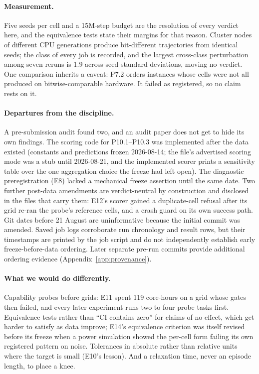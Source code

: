 \paragraph{Measurement.} Five seeds per cell and a 15M-step budget are the
resolution of every verdict here, and the equivalence tests state their
margins for that reason. Cluster nodes of different CPU generations produce
bit-different trajectories from identical seeds; the class of every job is
recorded, and the largest cross-class perturbation among seven reruns is
$1.9$ across-seed standard deviations, moving no verdict. One comparison
inherits a caveat: P7.2 orders instances whose cells were not all produced on
bitwise-comparable hardware. It failed as registered, so no claim rests on it.

\paragraph{Departures from the discipline.} A pre-submission audit found
two, and an audit paper does not get to hide its own findings. The scoring
code for P10.1--P10.3 was implemented after the data existed (constants and
predictions frozen 2026-08-14; the file's advertised scoring mode was a stub
until 2026-08-21, and the implemented scorer prints a sensitivity table over
the one aggregation choice the freeze had left open). The diagnostic
preregistration (E8) lacked a mechanical freeze assertion until the same date.
Two further post-data amendments are verdict-neutral by construction and
disclosed in the files that carry them: E12's scorer gained a duplicate-cell
refusal after its grid re-ran the probe's reference cells, and a crash guard
on its own success path. Git dates before 21 August are uninformative because
the initial commit was amended. Saved job logs corroborate run chronology
and result rows, but their timestamps are printed by the job script and do
not independently establish early freeze-before-data ordering. Later
separate pre-run commits provide additional ordering evidence
(Appendix~\ref{app:provenance}).

\paragraph{What we would do differently.} Capability probes before grids:
E11 spent 119 core-hours on a grid whose gates then failed, and every later
experiment runs two to four probe tasks first. Equivalence tests rather than
``CI contains zero'' for claims of no effect, which get harder to satisfy as
data improve; E14's equivalence criterion was itself revised before its freeze
when a power simulation showed the per-cell form failing its own registered
pattern on noise. Tolerances in absolute rather than relative units where the
target is small (E10's lesson). And a relaxation time, never an episode
length, to place a knee.

